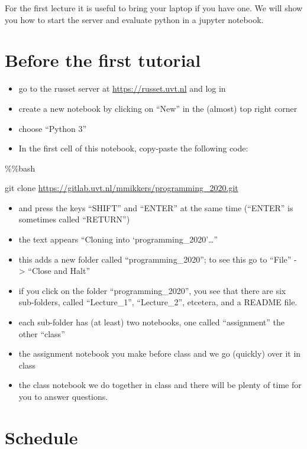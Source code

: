 \documentclass[]{book}
\providecommand{\tightlist}{%
  \setlength{\itemsep}{0pt}\setlength{\parskip}{0pt}}
\begin{document}
For the first lecture it is useful to bring your laptop if you have one. We will show you how to start the server and evaluate python in a jupyter notebook.

\hypertarget{before-the-first-tutorial}{%
\section{Before the first tutorial}\label{before-the-first-tutorial}}

\begin{itemize}
\tightlist
\item
  go to the russet server at \url{https://russet.uvt.nl} and log in
\item
  create a new notebook by clicking on ``New'' in the (almost) top right corner
\item
  choose ``Python 3''
\item
  In the first cell of this notebook, copy-paste the following code:
\end{itemize}

\%\%bash

git clone \url{https://gitlab.uvt.nl/mmikkers/programming_2020.git}

\begin{itemize}
\tightlist
\item
  and press the keys ``SHIFT'' and ``ENTER'' at the same time (``ENTER'' is sometimes called ``RETURN'')
\item
  the text appears ``Cloning into `programming\_2020'\ldots{}''
\item
  this adds a new folder called ``programming\_2020''; to see this go to ``File'' -\textgreater{} ``Close and Halt''
\item
  if you click on the folder ``programming\_2020'', you see that there are six sub-folders, called ``Lecture\_1'', ``Lecture\_2'', etcetera, and a README file.
\item
  each sub-folder has (at least) two notebooks, one called ``assignment'' the other ``class''
\item
  the assignment notebook you make before class and we go (quickly) over it in class
\item
  the class notebook we do together in class and there will be plenty of time for you to answer questions.
\end{itemize}

\hypertarget{schedule-1}{%
\section{Schedule}\label{schedule-1}}
\end{document}
